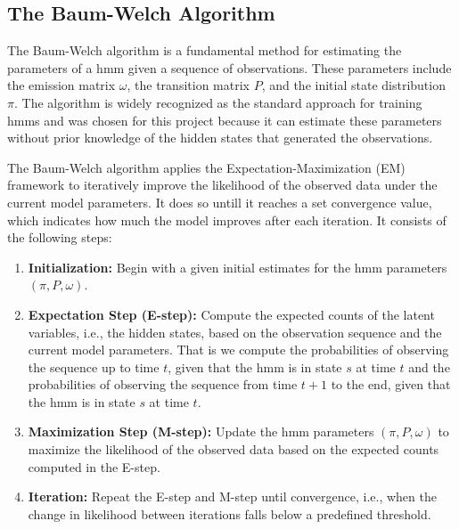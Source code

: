 

\subsection{The Baum-Welch Algorithm}\label{subsec:baum-welch}
The Baum-Welch algorithm is a fundamental method for estimating the parameters of a \gls{hmm} given a sequence of observations.
These parameters include the emission matrix $\omega$, the transition matrix $P$, and the initial state distribution $\pi$.
The algorithm is widely recognized as the standard approach for training \glspl{hmm} and was chosen for this project because it can estimate these parameters without prior knowledge of the hidden states that generated the observations.

The Baum-Welch algorithm applies the Expectation-Maximization (EM) framework to iteratively improve the likelihood of the observed data under the current model parameters. It does so untill it reaches a set convergence value, which indicates how much the model improves after each iteration.
It consists of the following steps:

\begin{enumerate}
    \item \textbf{Initialization:} Begin with a given initial estimates for the \gls{hmm} parameters $(\pi, P, \omega)$.
    \item \textbf{Expectation Step (E-step):} Compute the expected counts of the latent variables, i.e., the hidden states, based on the observation sequence and the current model parameters.
    That is we compute the probabilities of observing the sequence up to time $t$, given that the \gls{hmm} is in state $s$ at time $t$ and the probabilities of observing the sequence from time $t+1$ to the end, given that the \gls{hmm} is in state $s$ at time $t$.
    \item \textbf{Maximization Step (M-step):} Update the \gls{hmm} parameters $(\pi, P, \omega)$ to maximize the likelihood of the observed data based on the expected counts computed in the E-step.
    \item \textbf{Iteration:} Repeat the E-step and M-step until convergence, i.e., when the change in likelihood between iterations falls below a predefined threshold.
\end{enumerate}

